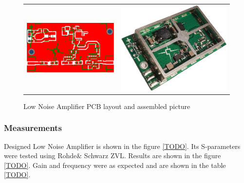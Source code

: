 \begin{figure}
   \centering
\begin{tabular}{cc}
        \includegraphics[width=0.4\paperwidth]{img/5/lna_pcb.eps}
    & 
        \includegraphics[width=0.3\paperwidth]{img/5/lna_assembled.jpg}
\end{tabular}
\label{lna_pcb}
\caption{Low Noise Amplifier PCB layout and assembled picture}
\end{figure}


\subsubsection{Measurements}
Designed Low Noise Amplifier is shown in the figure \ref{TODO}. Its S-parameters were tested using Rohde\& Schwarz ZVL. Results are shown in the figure \ref{TODO}. Gain and frequency were as expected and are shown in the table \ref{TODO}.


